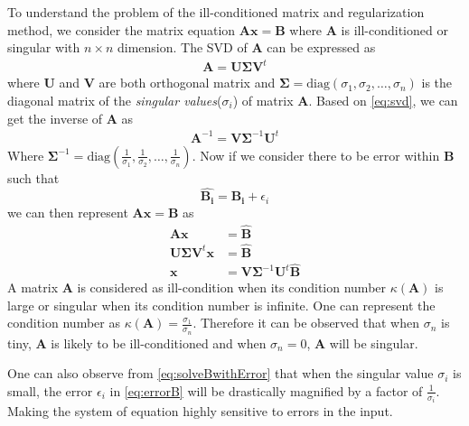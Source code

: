 			To understand the problem of the ill-conditioned matrix and regularization method, we consider the matrix equation $\boldsymbol{Ax}=\boldsymbol{B}$ where $\boldsymbol{A}$ is ill-conditioned or singular with $n\times n$ dimension.
			The \gls{SVD} of $\boldsymbol{A}$ can be expressed as 
			\begin{align}
				\boldsymbol{A} = \boldsymbol{U\Sigma V}^t
				\label{eq:svd}
			\end{align}
			where $\boldsymbol{U}$ and $\boldsymbol{V}$ are both orthogonal matrix and $\boldsymbol{\Sigma}=\mathrm{diag}(\sigma_1,\sigma_2,\dots,\sigma_n)$ is the diagonal matrix of the \emph{singular values}($\sigma_i$) of matrix $\boldsymbol{A}$.
			Based on \cref{eq:svd}, we can get the inverse of $\boldsymbol{A}$ as 
			\begin{align}
				\boldsymbol{A}^{-1}= \boldsymbol{V\Sigma}^{-1}\boldsymbol{U}^t
				\label{eq:svdInverse}
			\end{align}
			Where $
			\boldsymbol{\Sigma}^{-1} = \mathrm{diag}(\frac{1}{\sigma_1},\frac{1}{\sigma_2},\dots,\frac{1}{\sigma_n})$.
			Now if we consider there to be error within $\boldsymbol{B}$ such that
			\begin{equation}
				\boldsymbol{\hat{B_i}} = \boldsymbol{B_i}+\epsilon_i
				\label{eq:errorB}
			\end{equation}
			we can then represent $\boldsymbol{Ax}=\boldsymbol{B}$ as
			\begin{align}
				\boldsymbol{Ax}&=\boldsymbol{\hat{B}} \nonumber\\
				\boldsymbol{U\Sigma V}^t\boldsymbol{x}&=\boldsymbol{\hat{B}} \nonumber\\
				\boldsymbol{x}&=\boldsymbol{V\Sigma}^{-1}\boldsymbol{U}^t\boldsymbol{\hat{B}}
				\label{eq:solveBwithError}
			\end{align}
			A matrix $\boldsymbol{A}$ is considered as ill-condition when its condition number $\kappa(\boldsymbol{A})$ is large or singular when its condition number is infinite. 
			One can represent the condition number as $\kappa(\boldsymbol{A})=\frac{\sigma_1}{\sigma_n}$.
			Therefore it can be observed that when $\sigma_n$ is tiny, $\boldsymbol{A}$ is likely to be ill-conditioned and when $\sigma_n=0$, $\boldsymbol{A}$ will be singular. 
			
			One can also observe from \cref{eq:solveBwithError} that when the singular value $\sigma_i$ is small, the error $\epsilon_i$ in \cref{eq:errorB} will be drastically magnified by a factor of $\frac{1}{\sigma_i}$. 
			Making the system of equation highly sensitive to errors in the input.
			
